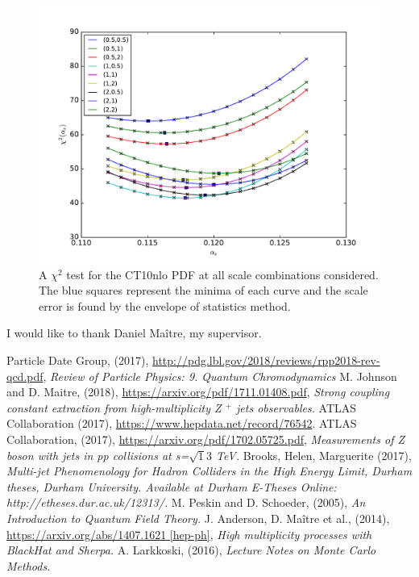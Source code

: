 \documentclass[12pt, onecolumn, nofootinbib]{revtex4}    %
\begin{document}
{\begin{figure} 
	\begin{center}
		\includegraphics[width=1 \textwidth]{CT10nlo0_curvefit.pdf}
		\caption{A ${\chi ^2}$ test for the CT10nlo PDF at all scale combinations considered. The blue squares represent the minima of each curve and the scale error is found by the envelope of statistics method.}
		\label{CHI}
	\end{center}
\end{figure}


\begin{acknowledgments}
I would like to thank Daniel Ma\^itre, my supervisor. 
\end{acknowledgments}

\begin{thebibliography}{99}
 Particle Date Group, (2017), \url{http://pdg.lbl.gov/2018/reviews/rpp2018-rev-qcd.pdf}, \textit{ Review of Particle Physics: 9. Quantum Chromodynamics}
M. Johnson and D. Maitre, (2018), \url{https://arxiv.org/pdf/1711.01408.pdf}, \textit{Strong coupling constant extraction from high-multiplicity Z ${^+}$ jets observables.}
 ATLAS Collaboration (2017), \url{https://www.hepdata.net/record/76542}.
 ATLAS Collaboration, (2017), \url{https://arxiv.org/pdf/1702.05725.pdf}, \textit{Measurements of Z boson with jets in pp collisions at s=${\sqrt 13}$ TeV.}
 Brooks, Helen, Marguerite (2017), \textit{Multi-jet Phenomenology for Hadron Colliders in the High Energy Limit, Durham theses, Durham University. Available at Durham E-Theses Online: http://etheses.dur.ac.uk/12313/.}
 M. Peskin and D. Schoeder, (2005), \textit{An Introduction to Quantum Field Theory.}
 J. Anderson, D. Ma\^itre et al., (2014), \url{https://arxiv.org/abs/1407.1621 [hep-ph]}, \textit{High multiplicity processes with BlackHat and Sherpa.}
 A. Larkkoski, (2016), \textit{Lecture Notes on Monte Carlo Methods.}



\end{thebibliography}}
\end{document}
